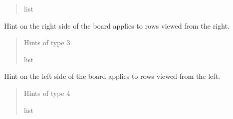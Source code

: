 \documentclass[letterpaper,10pt,english]{sphinxmanual}
\begin{document}
\begin{fulllineitems}
\begin{fulllineitems}
\begin{quote}
\begin{description}
\sphinxAtStartPar
list

\end{description}\end{quote}

\end{fulllineitems}


\begin{fulllineitems}
\label{\detokenize{hints:hints.HintsData.rightHint}}
\pysigstartsignatures
{}
\pysigstopsignatures
\sphinxAtStartPar
Hint on the right side of the board applies to rows viewed             from the right.
\begin{quote}\begin{description}
\sphinxAtStartPar
Hints of type 3

\sphinxAtStartPar
list

\end{description}\end{quote}

\end{fulllineitems}


\begin{fulllineitems}
\label{\detokenize{hints:hints.HintsData.leftHint}}
\pysigstartsignatures
{}
\pysigstopsignatures
\sphinxAtStartPar
Hint on the left side of the board applies to rows viewed            from the left.
\begin{quote}\begin{description}
\sphinxAtStartPar
Hints of type 4

\sphinxAtStartPar
list

\end{description}\end{quote}

\end{fulllineitems}


\end{fulllineitems}
\end{document}
